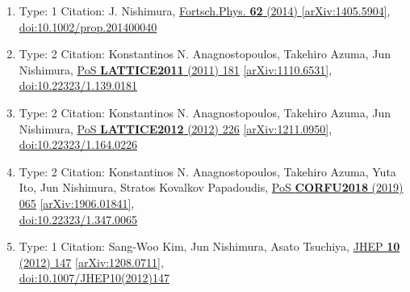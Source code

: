 \documentclass[a4paper,10pt]{article}
\begin{document}
\begin{enumerate}
\begin{enumerate}
  \item Type: 1 Citation: J. Nishimura, \href{https://www.doi.org/10.1002/prop.201400040}{Fortsch.Phys. {\bf 62} (2014) }  \href{https://arxiv.org/abs/1405.5904}{[arXiv:1405.5904]},\\\href{https://www.doi.org/10.1002/prop.201400040}{doi:10.1002/prop.201400040}
  \item Type: 2 Citation: Konstantinos N. Anagnostopoulos, Takehiro Azuma, Jun Nishimura, \href{https://www.doi.org/10.22323/1.139.0181}{PoS {\bf LATTICE2011} (2011) 181}  \href{https://arxiv.org/abs/1110.6531}{[arXiv:1110.6531]},\\\href{https://www.doi.org/10.22323/1.139.0181}{doi:10.22323/1.139.0181}
  \item Type: 2 Citation: Konstantinos N. Anagnostopoulos, Takehiro Azuma, Jun Nishimura, \href{https://www.doi.org/10.22323/1.164.0226}{PoS {\bf LATTICE2012} (2012) 226}  \href{https://arxiv.org/abs/1211.0950}{[arXiv:1211.0950]},\\\href{https://www.doi.org/10.22323/1.164.0226}{doi:10.22323/1.164.0226}
  \item Type: 2 Citation: Konstantinos N. Anagnostopoulos, Takehiro Azuma, Yuta Ito, Jun Nishimura, Stratos Kovalkov Papadoudis, \href{https://www.doi.org/10.22323/1.347.0065}{PoS {\bf CORFU2018} (2019) 065}  \href{https://arxiv.org/abs/1906.01841}{[arXiv:1906.01841]},\\\href{https://www.doi.org/10.22323/1.347.0065}{doi:10.22323/1.347.0065}
  \item Type: 1 Citation: Sang-Woo Kim, Jun Nishimura, Asato Tsuchiya, \href{https://www.doi.org/10.1007/JHEP10(2012)147}{JHEP {\bf 10} (2012) 147}  \href{https://arxiv.org/abs/1208.0711}{[arXiv:1208.0711]},\\\href{https://www.doi.org/10.1007/JHEP10(2012)147}{doi:10.1007/JHEP10(2012)147}

\end{enumerate}
\end{enumerate}
\end{document}
